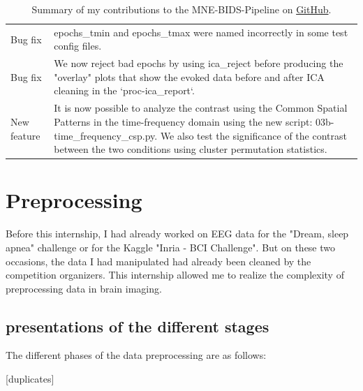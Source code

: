 \begin{table}[ht]
\begin{tabular}{@{}| p{3cm}|p{9cm}| @{}}
        Bug fix          & epochs\_tmin and epochs\_tmax were named incorrectly in some test config files.                                                                                                                                                                                             \\
        Bug fix          & We now reject bad epochs by using ica\_reject before producing the "overlay" plots that show the evoked data before and after ICA cleaning in the `proc-ica\_report`.                                                                                                       \\
        New feature      & It is now possible to analyze the contrast using the Common Spatial Patterns in the time-frequency domain using the new script: 03b-time\_frequency\_csp.py. We also test the significance of the contrast between the two conditions using cluster permutation statistics. \\
        \hline
    \end{tabular}

    \caption[Summary of my contributions to the MNE-BIDS-Pipeline.]%
    {Summary of my contributions to the MNE-BIDS-Pipeline on \href{https://raw.githubusercontent.com/mne-tools/mne-bids-pipeline/main/docs/source/changes.md}{GitHub}.}
    \label{Tab:PR}
\end{table}

\section{Preprocessing}

Before this internship, I had already worked on EEG data for the "Dream, sleep apnea" challenge or for the Kaggle "Inria - BCI Challenge". But on these two occasions, the data I had manipulated had already been cleaned by the competition organizers. This internship allowed me to realize the complexity of preprocessing data in brain imaging.

\subsection{presentations of the different stages}

The different phases of the data preprocessing are as follows:

[duplicates]

